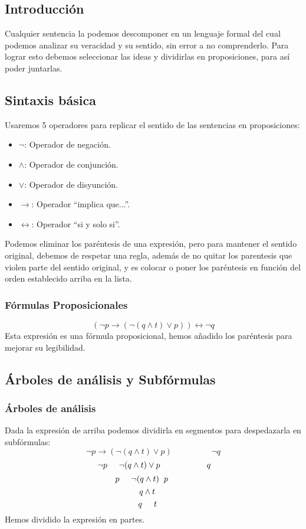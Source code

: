 \subsection{Introducción}
\noindent Cualquier sentencia la podemos descomponer en un lenguaje formal del cual podemos analizar su veracidad y su sentido, sin error a no comprenderlo. Para lograr esto debemos seleccionar las ideas y dividirlas en proposiciones, para así poder juntarlas.
\subsection{Sintaxis básica}
\noindent Usaremos 5 operadores para replicar el sentido de las sentencias en proposiciones:
\begin{itemize}
        \item \(\mathbf{\neg}\): Operador de negación.
        \item \(\mathbf{\land}\): Operador de conjunción.
        \item \(\mathbf{\lor}\): Operador de disyunción.
        \item \(\mathbf{\rightarrow}\): Operador ``implica que...''.
        \item \(\mathbf{\leftrightarrow}\): Operador ``si y solo si''.
\end{itemize}
\noindent Podemos eliminar los paréntesis de una expresión, pero para mantener el sentido original, debemos de respetar una regla, además de no quitar los parentesis que violen parte del sentido original, y es colocar o poner los paréntesis en función del orden establecido arriba en la lista.
\subsubsection{Fórmulas Proposicionales}
\[
        (\neg p \rightarrow (\neg(q \land t) \lor p) ) \leftrightarrow \neg q
\]
\noindent Esta expresión es una fórmula proposicional, hemos añadido los paréntesis para mejorar su legibilidad.
\subsection{Árboles de análisis y Subfórmulas}
\subsubsection{Árboles de análisis}
\noindent Dada la expresión de arriba podemos dividirla en segmentos para despedazarla en subfórmulas:
\[\neg p \rightarrow (\neg(q \land t) \lor p) \hspace{2cm} \neg q\]
\[\hspace{.1cm}\neg p \hspace{.5cm} \neg(q \land t) \lor p\hspace{2cm} q\]
\[\hspace{-1cm}p \hspace{.5cm} \neg(q \land t) \hspace{.2cm} p\]
\[\hspace{-.5cm}q \land t\]
\[\hspace{-.5cm}q \hspace{.5cm} t\]
\noindent Hemos dividido la expresión en partes.
